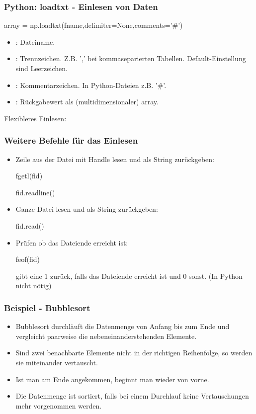 \documentclass[hyperref={xetex}]{beamer}
\begin{document}
%
\begin{frame}[fragile]\frametitle{Python: loadtxt - Einlesen von Daten}
\begin{pyin}
array = np.loadtxt(fname,delimiter=None,comments='#')
\end{pyin}
\begin{itemize}
  \item {}: Dateiname. 
  \item {}: Trennzeichen. Z.B. ',' bei kommaseparierten Tabellen. Default-Einstellung sind Leerzeichen.
  \item {}: Kommentarzeichen. In Python-Dateien z.B. '\#'.
  \item {}: Rückgabewert als (multidimensionaler) array.
\end{itemize}
Flexibleres Einlesen: 
\end{frame}
%
%
\begin{frame}[fragile]\frametitle{Weitere Befehle für das Einlesen}
\begin{itemize}
\item Zeile aus der Datei mit  Handle  lesen und als String zurückgeben:
\begin{matlabin}
fgetl(fid) 
\end{matlabin}
  \begin{pyin}
fid.readline()
  \end{pyin}
\item Ganze Datei lesen und als String zurückgeben:
  \begin{pyin}
fid.read()
  \end{pyin}
\item Prüfen ob das Dateiende erreicht ist:
\begin{matlabin}
feof(fid)
\end{matlabin}
 gibt eine $1$
  zurück, falls das Dateiende erreicht ist und $0$ sonst. (In Python nicht nötig)
\end{itemize}
\end{frame}
%
%
\begin{frame}[fragile]\frametitle{Beispiel - Bubblesort}
\begin{itemize}
\item Bubblesort durchläuft die Datenmenge von Anfang bis zum Ende und
vergleicht paarweise die nebeneinanderstehenden Elemente. 
\item Sind zwei
benachbarte Elemente nicht in der richtigen Reihenfolge, so werden sie
miteinander vertauscht. 
\item Ist man am Ende angekommen, beginnt man wieder
von vorne. 
\item Die Datenmenge ist sortiert, falls bei einem Durchlauf
keine Vertauschungen mehr vorgenommen werden.
\end{itemize} 
\end{frame}
\end{document}
